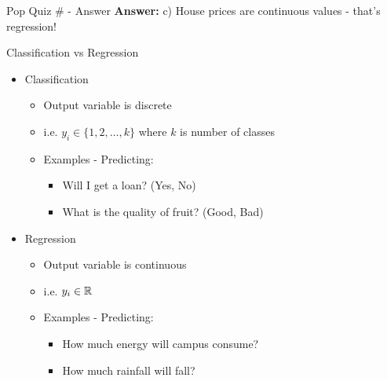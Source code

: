 \documentclass[usenames,dvipsnames]{beamer}
\begin{document}
\begin{frame}{Pop Quiz \#\thepopquiz{} - Answer}
\textbf{Answer:} c) House prices are continuous values - that's regression!
\end{frame}

\begin{frame}{Classification vs Regression}
\begin{itemize}
	\item Classification
	\begin{itemize}
		\item \pause Output variable is discrete
		\item \pause i.e.  $y_i \in \{1, 2, \ldots, k\}$ where $k$ is number of classes 
		\item \pause Examples - Predicting: 
		\begin{itemize}
			\item \pause Will I get a loan? (Yes, No)
			\item \pause What is the quality of fruit? (Good, Bad)
		\end{itemize}
	\end{itemize}
	\item \pause Regression
	\begin{itemize}
		\item \pause Output variable is continuous
		\item \pause i.e.  $y_i \in \mathbb{R}$ 
		\item \pause Examples - Predicting: 
		\begin{itemize}
			\item \pause How much energy will campus consume? 
			\item \pause How much rainfall will fall?
		\end{itemize}
	\end{itemize}
\end{itemize}

\end{frame}
\end{document}
